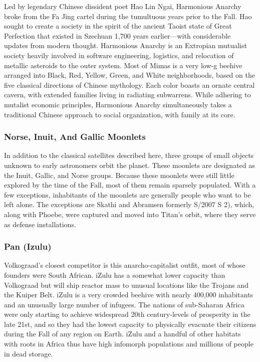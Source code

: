 Led by legendary Chinese dissident poet Hao Lin 
Ngai, Harmonious Anarchy broke from the Fa Jing 
cartel during the tumultuous years prior to the Fall. 
Hao sought to create a society in the spirit of the 
ancient Taoist state of Great Perfection that existed 
in Szechuan 1,700 years earlier—with considerable 
updates from modern thought. Harmonious Anarchy 
is an Extropian mutualist society heavily involved in 
software engineering, logistics, and relocation of metallic
asteroids to the outer system. Most of Mimas is
a very low-g beehive arranged into Black, Red, Yellow, 
Green, and White neighborhoods, based on the five 
classical directions of Chinese mythology. Each color 
boasts an ornate central cavern, with extended families
living in radiating subwarrens. While adhering to
mutalist economic principles, Harmonious Anarchy 
simultaneously takes a traditional Chinese approach 
to social organization, with family at its core.

\subsubsection{Norse, Inuit, And Gallic Moonlets}

In addition to the classical satellites described here, 
three groups of small objects unknown to early 
astronomers orbit the planet. These moonlets are 
designated as the Inuit, Gallic, and Norse groups. 
Because these moonlets were still little explored by 
the time of the Fall, most of them remain sparsely 
populated. With a few exceptions, inhabitants of the 
moonlets are generally people who want to be left 
alone. The exceptions are Skathi and Abramsen formerly
S/2007 S 2), which, along with Phoebe, were
captured and moved into Titan's orbit, where they 
serve as defense installations.

\subsubsection{Pan (Izulu)}

Volkograad's closest competitor is this anarcho-capitalist
outfit, most of whose founders were South
African. iZulu has a somewhat lower capacity than 
Volkograad but will ship reactor mass to unusual 
locations like the Trojans and the Kuiper Belt. iZulu is 
a very crowded beehive with nearly 400,000 inhabitants
and an unusually large number of infugees. The
nations of sub-Saharan Africa were only starting to 
achieve widespread 20th century-levels of prosperity 
in the late 21st, and so they had the lowest capacity to 
physically evacuate their citizens during the Fall of any 
region on Earth. iZulu and a handful of other habitats 
with roots in Africa thus have high infomorph populations
and millions of people in dead storage.

